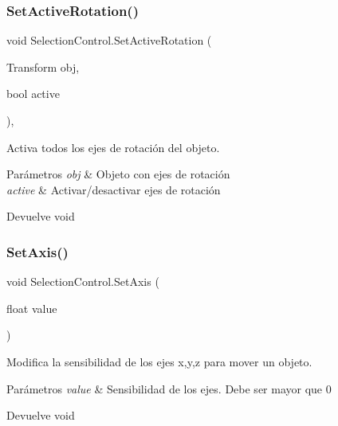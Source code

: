 \subsubsection{\texorpdfstring{SetActiveRotation()}{SetActiveRotation()}}
{\footnotesize\ttfamily void Selection\+Control.\+Set\+Active\+Rotation (\begin{DoxyParamCaption}\item[{Transform}]{obj,  }\item[{bool}]{active }\end{DoxyParamCaption})\hspace{0.3cm}{\ttfamily [inline]}, {\ttfamily [private]}}

Activa todos los ejes de rotación del objeto. 
\begin{DoxyParams}{Parámetros}
{\em obj} & Objeto con ejes de rotación \\
\hline
{\em active} & Activar/desactivar ejes de rotación \\
\hline
\end{DoxyParams}
\begin{DoxyReturn}{Devuelve}
void 
\end{DoxyReturn}
\mbox{\label{class_selection_control_a5d456be16e3132ae65d37f866ee009f3}} 
\subsubsection{\texorpdfstring{SetAxis()}{SetAxis()}}
{\footnotesize\ttfamily void Selection\+Control.\+Set\+Axis (\begin{DoxyParamCaption}\item[{float}]{value }\end{DoxyParamCaption})\hspace{0.3cm}{\ttfamily [inline]}}

Modifica la sensibilidad de los ejes x,y,z para mover un objeto. 
\begin{DoxyParams}{Parámetros}
{\em value} & Sensibilidad de los ejes. Debe ser mayor que 0 \\
\hline
\end{DoxyParams}
\begin{DoxyReturn}{Devuelve}
void 
\end{DoxyReturn}
\mbox{\label{class_selection_control_ab62778748bb69e20a9fd3318a3083853}} 
